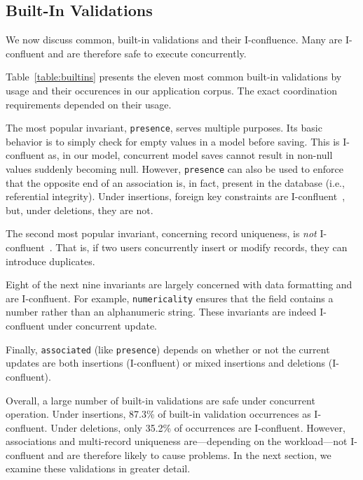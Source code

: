 \subsection{Built-In Validations}

We now discuss common, built-in validations and their
I-confluence. Many are I-confluent and are therefore safe to execute
concurrently.

Table~\ref{table:builtins} presents the eleven most common built-in
validations by usage and their occurences in our application
corpus. The exact coordination requirements depended on their usage.

The most popular invariant, \texttt{presence}, serves multiple purposes. Its
basic behavior is to simply check for empty values in a model before
saving. This is I-confluent as, in our model, concurrent model saves
cannot result in non-null values suddenly becoming null. However,
\texttt{presence} can also be used to enforce that the opposite end of
an association is, in fact, present in the database (i.e., referential
integrity). Under insertions, foreign key constraints are
I-confluent~\cite{coord-avoid}, but, under deletions, they are not.

The second most popular invariant, concerning record uniqueness, is
\textit{not} I-confluent~\cite{coord-avoid}. That is, if two users
concurrently insert or modify records, they can introduce duplicates.

Eight of the next nine invariants are largely concerned with data
formatting and are I-confluent. For example, \texttt{numericality}
ensures that the field contains a number rather than an alphanumeric
string. These invariants are indeed I-confluent under concurrent
update.

Finally, \texttt{associated} (like \texttt{presence}) depends on
whether or not the current updates are both insertions (I-confluent)
or mixed insertions and deletions (I-confluent).

Overall, a large number of built-in validations are safe under
concurrent operation. Under insertions, 87.3\% of built-in validation
occurrences as I-confluent. Under deletions, only 35.2\% of
occurrences are I-confluent.  However, associations and multi-record
uniqueness are---depending on the workload---not I-confluent and are
therefore likely to cause problems. In the next section, we examine
these validations in greater detail.

